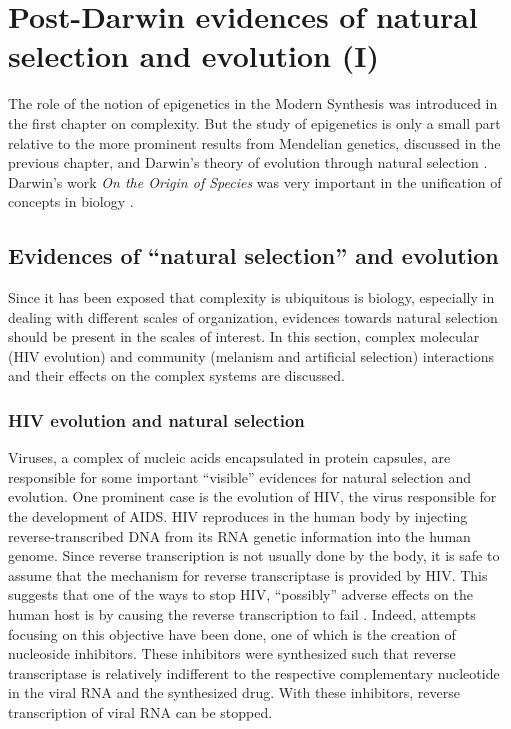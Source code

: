 \chapter{Post-Darwin evidences of natural selection and evolution (I)}

The role of the notion of epigenetics in the Modern Synthesis \cite{Baedke2013, Goldberg2007} was introduced in the first chapter on complexity.
But the study of epigenetics is only a small part relative to the more prominent results from Mendelian genetics, discussed in the previous chapter, and Darwin's theory of evolution through natural selection \cite{Ridley}.
Darwin's work \textit{On the Origin of Species} was very important in the unification of concepts in biology \cite{biomain}.

\section{Evidences of ``natural selection'' and evolution}

Since it has been exposed that complexity is ubiquitous is biology, especially in dealing with different scales of organization, evidences towards natural selection should be present in the scales of interest.
In this section, complex molecular (HIV evolution) and community (melanism and artificial selection) interactions and their effects on the complex systems are discussed.

\subsection{HIV evolution and natural selection} %
Viruses, a complex of nucleic acids encapsulated in protein capsules, are responsible for some important ``visible'' evidences for natural selection and evolution.
One prominent case is the evolution of HIV, the virus responsible for the development of AIDS.
HIV reproduces in the human body by injecting reverse-transcribed DNA from its RNA genetic information into the human genome.
Since reverse transcription is not usually done by the body, it is safe to assume that the mechanism for reverse transcriptase is provided by HIV.
This suggests that one of the ways to stop HIV, ``possibly'' adverse effects on the human host is by causing the reverse transcription to fail \cite{Ridley}.
Indeed, attempts focusing on this objective have been done, one of which is the creation of nucleoside inhibitors.
These inhibitors were synthesized such that reverse transcriptase is relatively indifferent to the respective complementary nucleotide in the viral RNA and the synthesized drug.
With these inhibitors, reverse transcription of viral RNA can be stopped.

